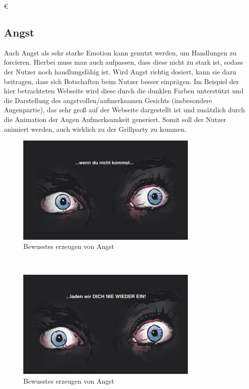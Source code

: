 €\documentclass[./dokumentation.tex]{subfiles}
\begin{document}
\subsection{Angst}
Auch Angst als sehr starke Emotion  kann genutzt werden, um Handlungen zu forcieren. Hierbei muss man auch aufpassen, dass diese nicht zu stark ist, sodass der Nutzer noch handlungsfähig ist. Wird Angst richtig dosiert, kann sie dazu beitragen, dass sich Botschaften beim Nutzer besser einprägen. Im Beispiel der hier betrachteten Webseite wird diese durch die dunklen Farben unterstützt und die Darstellung des angstvollen/aufmerksamen Gesichts (insbesondere Augenpartie), das sehr groß auf der Webseite dargestellt ist und zusätzlich durch die Animation der Augen Aufmerksamkeit generiert. Somit soll der Nutzer animiert werden, auch wirklich zu der Grillparty zu kommen.\\

\begin{figure}[H]
    \centering
    \includegraphics[width=0.8\textwidth]{bilder/angst1.png}
    \caption{Bewusstes erzeugen von Angst}
    \label{fig18:angst1}
\end{figure}\\

\begin{figure}[H]
    \centering
    \includegraphics[width=0.8\textwidth]{bilder/angst2.png}
    \caption{Bewusstes erzeugen von Angst}
    \label{fig19:angst2}
\end{figure}\\
\end{document}
